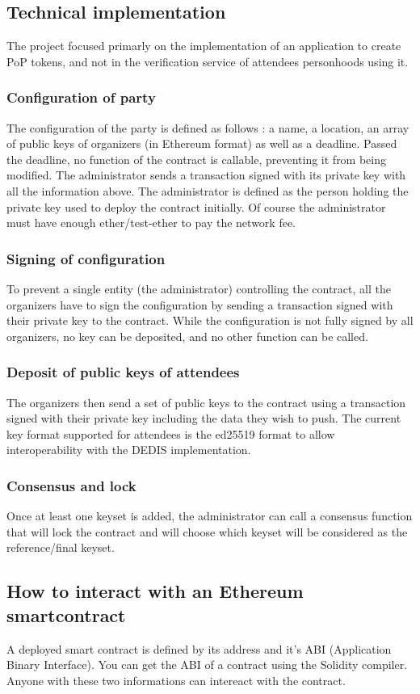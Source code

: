 \documentclass[11pt, a4paper, twoside, openright]{book} %
\begin{document}
\subsection{Technical implementation}
The project focused primarly on the implementation of an application to create PoP tokens, and not in the verification service of attendees personhoods using it.
\subsubsection{Configuration of party}
The configuration of the party is defined as follows : a name, a location, an array of public keys of organizers (in Ethereum format) as well as a deadline. Passed the deadline, no function of the contract is callable, preventing it from being modified. The administrator sends a transaction signed with its private key with all the information above. The administrator is defined as the person holding the private key used to deploy the contract initially. Of course the administrator must have enough ether/test-ether to pay the network fee.
\subsubsection{Signing of configuration}
To prevent a single entity (the administrator) controlling the contract, all the organizers have to sign the configuration by sending a transaction signed with their private key to the contract. While the configuration is not fully signed by all organizers, no key can be deposited, and no other function can be called.
\subsubsection{Deposit of public keys of attendees}
The organizers then send a set of public keys to the contract using a transaction signed with their private key including the data they wish to push. The current key format supported for attendees is the ed25519 format to allow interoperability with the DEDIS implementation.
\subsubsection{Consensus and lock}
Once at least one keyset is added, the administrator can call a consensus function that will lock the contract and will choose which keyset will be considered as the reference/final keyset.


\subsection{How to interact with an Ethereum smartcontract}
A deployed smart contract is defined by its address and it's ABI (Application Binary Interface). You can get the ABI of a contract using the Solidity compiler. Anyone with these two informations can intereact with the contract.
\end{document}
